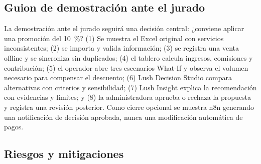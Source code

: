 \subsection{Guion de demostración ante el jurado}

La demostración ante el jurado seguirá una decisión central: ¿conviene aplicar una promoción del 10~\%? (1) Se muestra el Excel original con servicios inconsistentes; (2) se importa y valida información; (3) se registra una venta offline y se sincroniza sin duplicados; (4) el tablero calcula ingresos, comisiones y contribución; (5) el operador abre tres escenarios What-If y observa el volumen necesario para compensar el descuento; (6) Lush Decision Studio compara alternativas con criterios y sensibilidad; (7) Lush Insight explica la recomendación con evidencias y límites; y (8) la administradora aprueba o rechaza la propuesta y registra una revisión posterior. Como cierre opcional se muestra n8n generando una notificación de decisión aprobada, nunca una modificación automática de pagos.


\subsection{Riesgos y mitigaciones}

